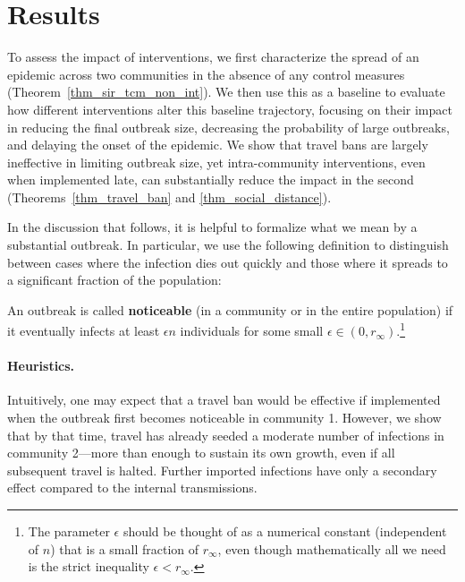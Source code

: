 \documentclass[11pt]{article}
\begin{document}
\section{Results}
\label{sec:results}



To assess the impact of interventions, we first characterize the spread of an epidemic across two communities in the absence of any control measures (Theorem~\ref{thm_sir_tcm_non_int}). We then use this as a baseline to evaluate how different interventions alter this baseline trajectory, focusing on their impact in reducing the final outbreak size, decreasing the probability of large outbreaks, and delaying the onset of the epidemic. We show that travel bans are largely ineffective in limiting outbreak size, yet intra-community interventions, even when implemented late, can substantially reduce the impact in the second (Theorems~\ref{thm_travel_ban} and \ref{thm_social_distance}).


In the discussion that follows, it is helpful to formalize what we mean by a substantial outbreak. In particular, we use the following definition to distinguish between cases where the infection dies out quickly and those where it spreads to a significant fraction of the population:

\begin{definition}
    An outbreak is called \textbf{noticeable} (in a community or in the entire population) if it eventually infects at least $\epsilon n$ individuals for some small $\epsilon \in (0,r_\infty)$.\footnote{The parameter $\epsilon$ should be thought of as a numerical constant (independent of $n$) that is a small fraction of $r_\infty$, even though mathematically all we need is the strict inequality $\epsilon<r_\infty$.}
\end{definition}

\paragraph{Heuristics.}
Intuitively, one may expect that a travel ban would be effective if implemented when the outbreak first becomes noticeable in community 1. However, we show that by that time, travel has already seeded a moderate number of infections in community 2---more than enough to sustain its own growth, even if all subsequent travel is halted. Further imported infections have only a secondary effect compared to the internal transmissions.
\end{document}
